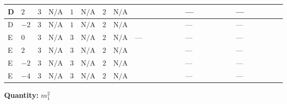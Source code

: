\documentclass[8pt]{article}
\begin{document}
\begin{landscape}
\begin{longtable}{@{}llcccccc >{\raggedright\arraybackslash}p{0.21\linewidth} >{\raggedright\arraybackslash}p{0.21\linewidth} >{\raggedright\arraybackslash}p{0.21\linewidth}@{}}
\midrule
D & $2$ & $3$ & $\text{N/A}$ & $1$ & $\text{N/A}$ & $2$ & $\text{N/A}$ & \scriptsize\adjustbox{max width=\linewidth}{$\begin{gathered} -6 {g_1}^2 {m_1^2}\end{gathered}$} & --- & --- \\
\midrule
D & $-2$ & $3$ & $\text{N/A}$ & $1$ & $\text{N/A}$ & $2$ & $\text{N/A}$ & \scriptsize\adjustbox{max width=\linewidth}{$\begin{gathered} -6 {g_1}^2 {m_1^2}\end{gathered}$} & --- & --- \\
\midrule
E & $0$ & $3$ & $\text{N/A}$ & $3$ & $\text{N/A}$ & $2$ & $\text{N/A}$ & --- & --- & --- \\
\midrule
E & $2$ & $3$ & $\text{N/A}$ & $3$ & $\text{N/A}$ & $2$ & $\text{N/A}$ & \scriptsize\adjustbox{max width=\linewidth}{$\begin{gathered} -6 {g_1}^2 {m_1^2}\end{gathered}$} & --- & --- \\
\midrule
E & $-2$ & $3$ & $\text{N/A}$ & $3$ & $\text{N/A}$ & $2$ & $\text{N/A}$ & \scriptsize\adjustbox{max width=\linewidth}{$\begin{gathered} -6 {g_1}^2 {m_1^2}\end{gathered}$} & --- & --- \\
\midrule
E & $-4$ & $3$ & $\text{N/A}$ & $3$ & $\text{N/A}$ & $2$ & $\text{N/A}$ & \scriptsize\adjustbox{max width=\linewidth}{$\begin{gathered} -24 {g_1}^2 {m_1^2}\end{gathered}$} & --- & --- \\
\midrule
\bottomrule
\end{longtable}
\clearpage
\noindent\textbf{Quantity: }$m_1^2$\par\smallskip

\end{landscape}
\end{document}
